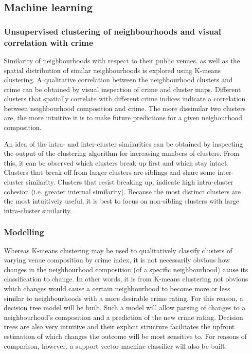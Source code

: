 \documentclass{article}
\begin{document}
\subsection{Machine learning}
\subsubsection{Unsupervised clustering of neighbourhoods and visual correlation with crime}
Similarity of neighbourhoods with respect to their public venues, as well as the spatial distribution of similar neighbourhoods is explored using K-means clustering. A qualitative correlation between the neighbourhood clusters and crime can be obtained by visual inspection of crime and cluster maps. Different clusters that spatially correlate with different crime indices indicate a correlation between neighbourhood composition and crime. The more dissimilar two clusters are, the more intuitive it is to make future predictions for a given neighourhood composition. 

An idea of the intra- and inter-cluster similarities can be obtained by inspecting the output of the clustering algorithm for increasing numbers of clusters. From this, it can be observed which clusters break up first and which stay intact.  Clusters that break off from larger clusters are siblings and share some inter-cluster similarity. Clusters that resist breaking up, indicate high intra-cluster cohesion (i.e. greater internal similarity). Because the most distinct clusters are the most intuitively useful, it is best to focus on non-sibling clusters with large intra-cluster similarity.

\subsubsection{Modelling}
Whereas K-means clustering may be used to qualitatively classify clusters of varying venue composition by crime index, it is not necessarily obvious how changes in the neighbourhood composition (of a specific neighbourhood) cause its classification to change. In other words, it is from K-means clustering not obvious which changes would cause a certain neighbourhood to become more or less similar to neighbourhoods with a more desirable crime rating. For this reason, a decision tree model will be built. Such a model will allow parsing of changes to a neighbourhood's composition and a prediction of the new crime rating. Decision trees are also very intuitive and their explicit structure facilitates the upfront estimation of which changes the outcome will be most sensitive to. For reasons of comparison, however, a support vector machine classifier will also be built.
\end{document}
